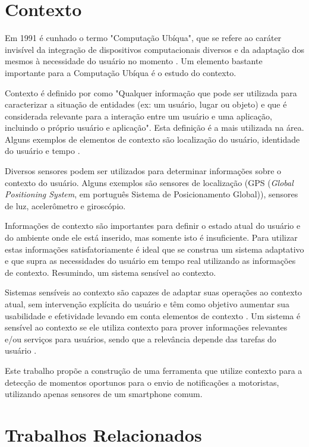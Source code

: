 \section{Contexto}
\label{contexto}

Em 1991 é cunhado o termo "Computação Ubíqua", que se refere ao caráter invisível da integração de dispositivos
computacionais diversos e da adaptação dos mesmos à necessidade do usuário no momento \cite{weiser1991computer}.
Um elemento bastante importante para a Computação Ubíqua é o estudo do contexto.

Contexto é definido por  como "Qualquer informação que pode ser utilizada para
caracterizar a situação de entidades (ex: um usuário, lugar ou objeto) e que é considerada relevante para
a interação entre um usuário e uma aplicação, incluindo o próprio usuário e aplicação". Esta definição é
a mais utilizada na área. Alguns exemplos de elementos de contexto são
localização do usuário, identidade do usuário e tempo \cite{ryan1999enhanced}.

Diversos sensores podem ser utilizados para determinar informações sobre o contexto do usuário. Alguns exemplos são
sensores de localização (GPS (\textit{Global Positioning System}, em português Sistema de Posicionamento Global)),
sensores de luz, acelerômetro e giroscópio.

Informações de contexto são importantes para definir o estado atual do usuário e do ambiente onde ele está inserido,
mas somente isto é insuficiente. Para utilizar estas informações satisfatoriamente é ideal que se construa um sistema
adaptativo e que supra as necessidades do usuário em tempo real utilizando as informações de contexto. Resumindo,
um sistema sensível ao contexto.

Sistemas sensíveis ao contexto são capazes de adaptar suas operações ao contexto atual, sem intervenção
explícita do usuário e têm como objetivo aumentar sua usabilidade e efetividade levando em conta elementos
de contexto \cite{baldauf2007survey}.  Um sistema é sensível ao contexto se ele utiliza contexto para prover
informações relevantes e/ou serviços para usuários, sendo que a relevância depende das tarefas do usuário
\cite{abowd1999towards}.

Este trabalho propõe a construção de uma ferramenta que utilize contexto para a detecção de momentos oportunos para
o envio de notificações a motoristas, utilizando apenas sensores de um smartphone comum.

\section{Trabalhos Relacionados}
\label{trabalhos-relacionados}

